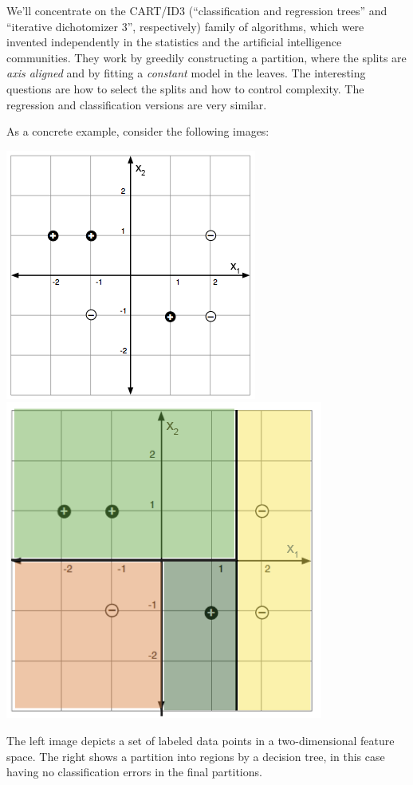 We'll concentrate on the CART/ID3 (``classification and regression
trees'' and ``iterative dichotomizer 3'', respectively) family of
algorithms, which were invented independently in the statistics and
the artificial intelligence communities.  They work by greedily
constructing a partition, where the splits are {\em axis aligned} and
by fitting a {\em constant} model in the leaves.  The interesting
questions are how to select the splits and how to control complexity.
The regression and classification versions are very similar.

As a concrete example, consider the following images:
\begin{center}
  \includegraphics[scale=1]{figures/dt_points.png}
  \includegraphics[scale=1]{figures/dt_soln.png}
\end{center}
The left image depicts a set of labeled data points in a two-dimensional
feature space. The right shows a partition into regions by a decision
tree, in this case having no classification errors in the final
partitions.


